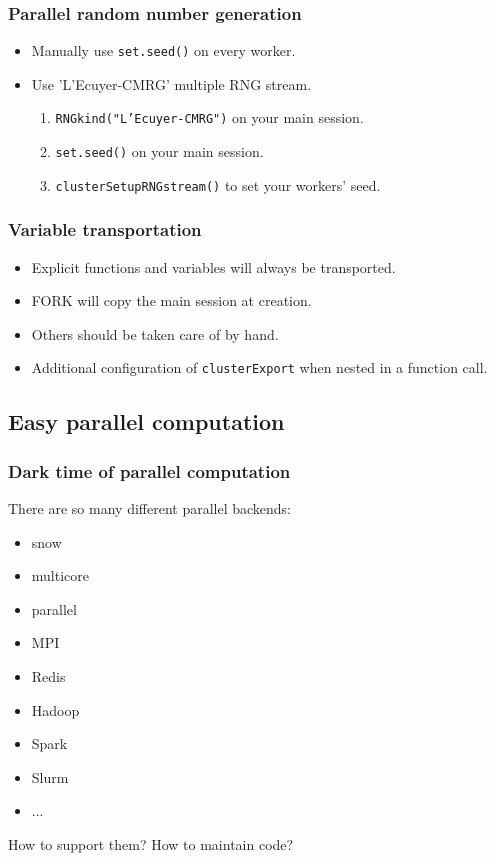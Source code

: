 \documentclass[aspectratio=169,xcolor={dvipsnames,table}]{beamer}
\begin{document}
\begin{frame}
  \frametitle{Parallel random number generation}
  \begin{itemize}
  \item Manually use \texttt{set.seed()} on every worker.
  \item Use 'L’Ecuyer-CMRG' multiple RNG stream.
    \begin{enumerate}
    \item \texttt{RNGkind("L'Ecuyer-CMRG")} on your main session.
    \item \texttt{set.seed()} on your main session.
    \item \texttt{clusterSetupRNGstream()} to set your workers' seed.
    \end{enumerate}
  \end{itemize}
\end{frame}

\begin{frame}[fragile]
  \frametitle{Variable transportation}
  \begin{itemize}
  \item Explicit functions and variables will always be transported.
  \item FORK will copy the main session at creation.
  \item Others should be taken care of by hand.
  \item Additional configuration of \texttt{clusterExport} when nested in a function call.
  \end{itemize}
\end{frame}

\subsection{Easy parallel computation}
\begin{frame}
  \frametitle{Dark time of parallel computation}
  There are so many different parallel backends:
  \begin{itemize}
  \item snow
  \item multicore
  \item parallel
  \item MPI
  \item Redis
  \item Hadoop
  \item Spark
  \item Slurm
  \item ...
  \end{itemize}
  How to support them? How to maintain code?
\end{frame}
\end{document}
